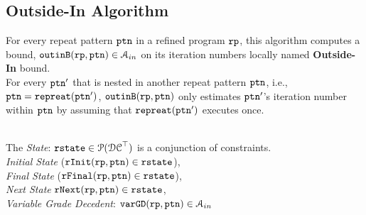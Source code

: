 \subsection{Outside-In Algorithm}
\label{sec:pathsensitive_rb-outinalg}
%
For every repeat pattern $\mathtt{ptn}$ in a refined program $\mathtt{rp}$, 
this algorithm
computes a bound, $\mathtt{outinB}(\mathtt{rp}, \mathtt{ptn}) \in \mathcal{A}_{in}$ on its iteration numbers locally named \textbf{Outside-In} bound.
\\
For every $\mathtt{ptn}'$ that is nested
in another repeat pattern $\mathtt{ptn}$, i.e., $\mathtt{ptn} = \mathtt{repreat}(\mathtt{ptn}')$,
$\mathtt{outinB}(\mathtt{rp}, \mathtt{ptn})$ only estimates
$\mathtt{ptn}'$'s iteration number within $\mathtt{ptn}$ by assuming that $\mathtt{repreat}(\mathtt{ptn}')$ executes once.

\\
The \emph{State}: 
$\mathtt{rstate} \in \mathcal{P}(\mathcal{DC}^{\top})$ is a conjunction of constraints.
\\
\emph{Initial State} ($\mathtt{rInit}(\mathtt{rp}, \mathtt{ptn}) \in \mathtt{rstate}$), 
\\
\emph{Final State} ($\mathtt{rFinal}(\mathtt{rp}, \mathtt{ptn}) \in \mathtt{rstate}$),
\\
\emph{Next State} $\mathtt{rNext}(\mathtt{rp}, \mathtt{ptn}) \in \mathtt{rstate}$,
\\
\emph{Variable Grade Decedent}: $\mathtt{varGD}(\mathtt{rp}, \mathtt{ptn}) \in \mathcal{A}_{in}$

